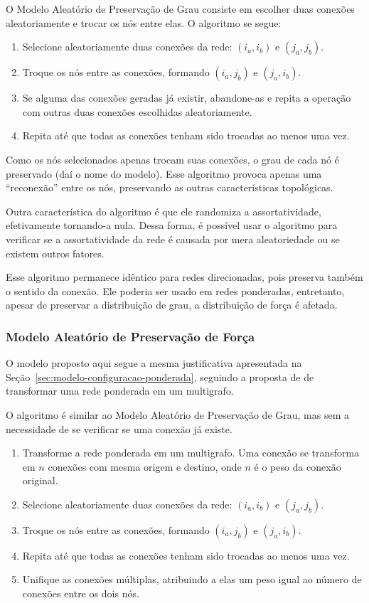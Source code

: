 \documentclass[12pt,a4paper]{article}
\theoremstyle{hypo}
\begin{document}
O Modelo Aleatório de Preservação de Grau consiste em escolher duas conexões aleatoriamente e trocar os nós entre elas. O algoritmo se segue:

\begin{enumerate}
\item Selecione aleatoriamente duas conexões da rede: $(i_a, i_b)$ e $(j_a, j_b)$.
\item Troque os nós entre as conexões, formando $(i_a, j_b)$ e $(j_a, i_b)$. 
\item Se alguma das conexões geradas já existir, abandone-as e repita a operação com outras duas conexões escolhidas aleatoriamente.
\item Repita até que todas as conexões tenham sido trocadas ao menos uma vez.
\end{enumerate}

Como os nós selecionados apenas trocam suas conexões, o grau de cada nó é preservado (daí o nome do modelo). Esse algoritmo provoca apenas uma \enquote{reconexão} entre os nós, preservando as outras características topológicas.

Outra característica do algoritmo é que ele randomiza a assortatividade, efetivamente tornando-a nula. Dessa forma, é possível usar o algoritmo para verificar se a assortatividade da rede é causada por mera aleatoriedade ou se existem outros fatores.

Esse algoritmo permanece idêntico para redes direcionadas, pois preserva também o sentido da conexão. Ele poderia ser usado em redes ponderadas, entretanto, apesar de preservar a distribuição de grau, a distribuição de força é afetada.

\subsubsection{Modelo Aleatório de Preservação de Força}

O modelo proposto aqui segue a mesma justificativa apresentada na Seção~\ref{sec:modelo-configuracao-ponderada}, seguindo a proposta de \cite{Newman2004-by} de transformar uma rede ponderada em um multigrafo.

O algoritmo é similar ao Modelo Aleatório de Preservação de Grau, mas sem a necessidade de se verificar se uma conexão já existe.

\begin{enumerate}
\item Transforme a rede ponderada em um multigrafo. Uma conexão se transforma em $n$ conexões com mesma origem e destino, onde $n$ é o peso da conexão original.
\item Selecione aleatoriamente duas conexões da rede: $(i_a, i_b)$ e $(j_a, j_b)$.
\item Troque os nós entre as conexões, formando $(i_a, j_b)$ e $(j_a, i_b)$. 
\item Repita até que todas as conexões tenham sido trocadas ao menos uma vez.
\item Unifique as conexões múltiplas, atribuindo a elas um peso igual ao número de conexões entre os dois nós.
\end{enumerate}
\end{document}
